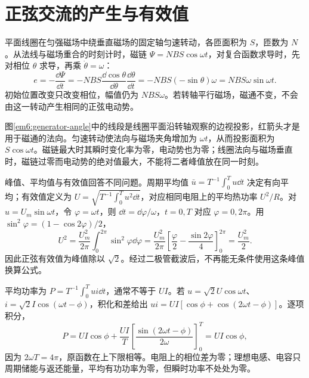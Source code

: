 \section{正弦交流的产生与有效值}

平面线圈在匀强磁场中绕垂直磁场的固定轴匀速转动，各匝面积为 $S$，匝数为 $N$。从法线与磁场重合的时刻计时，磁链 $\Psi=NBS\cos\omega t$，对复合函数求导时，先对相位 $\theta$ 求导，再乘 $\dot\theta=\omega$：
\[
 e=-\frac{\dd\Psi}{\dd t}
 =-NBS\frac{\dd\cos\theta}{\dd\theta}\frac{\dd\theta}{\dd t}
 =-NBS(-\sin\theta)\omega
 =NBS\omega\sin\omega t.
\]初始位置改变只改变相位，幅值仍为 $NBS\omega$。若转轴平行磁场，磁通不变，不会由这一转动产生相同的正弦电动势。

图\ref{em6:generator-angle}中的线段是线圈平面沿转轴观察的边视投影，红箭头才是用于磁通的法向。匀速转动使法向与磁场夹角增加为 $\omega t$，从而投影面积为 $S\cos\omega t$。磁链最大时其瞬时变化率为零，电动势也为零；线圈法向与磁场垂直时，磁链过零而电动势的绝对值最大，不能将二者峰值放在同一时刻。


峰值、平均值与有效值回答不同问题。周期平均值 $\bar u=T^{-1}\int_0^T u\dd t$ 决定有向平均；有效值定义为 $U=\sqrt{T^{-1}\int_0^T u^2\dd t}$，对应相同电阻上的平均热功率 $U^2/R$。对 $u=U_m\sin\omega t$，令 $\varphi=\omega t$，则 $\dd t=\dd\varphi/\omega$，$t=0,T$ 对应 $\varphi=0,2\pi$。用 $\sin^2\varphi=(1-\cos2\varphi)/2$，
\[
 U^2=\frac{U_m^2}{2\pi}\int_0^{2\pi}\sin^2\varphi\dd\varphi
 =\frac{U_m^2}{2\pi}\left[\frac{\varphi}{2}-\frac{\sin2\varphi}{4}\right]_0^{2\pi}
 =\frac{U_m^2}{2}.
\]
因此正弦有效值为峰值除以 $\sqrt2$。经过二极管截波后，不再能无条件使用这条峰值换算公式。

平均功率为 $P=T^{-1}\int_0^T ui\dd t$，通常不等于 $UI$。若 $u=\sqrt2U\cos\omega t$、$i=\sqrt2I\cos(\omega t-\phi)$，积化和差给出 $ui=UI[\cos\phi+\cos(2\omega t-\phi)]$。逐项积分，
\[
 P=UI\cos\phi+\frac{UI}{T}
 \left[\frac{\sin(2\omega t-\phi)}{2\omega}\right]_0^T
 =UI\cos\phi,
\]
因为 $2\omega T=4\pi$，原函数在上下限相等。电阻上的相位差为零；理想电感、电容只周期储能与返还能量，平均有功功率为零，但瞬时功率不处处为零。

